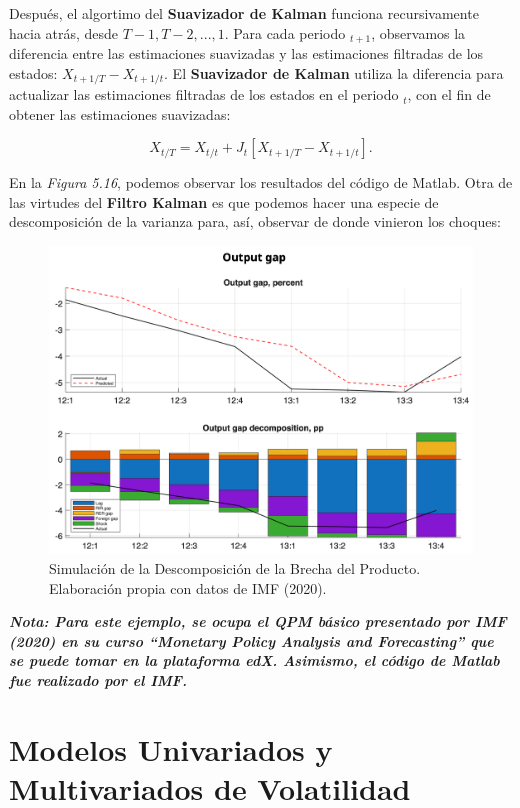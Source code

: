 \documentclass[
]{book}
\begin{document}
Después, el algortimo del \textbf{Suavizador de Kalman} funciona recursivamente hacia atrás, desde \(T-1, T-2,...,1\). Para cada periodo \(_{t+1}\), observamos la diferencia entre las estimaciones suavizadas y las estimaciones filtradas de los estados: \(X_{t+1/T}-X_{t+1/t}\). El \textbf{Suavizador de Kalman} utiliza la diferencia para actualizar las estimaciones filtradas de los estados en el periodo \(_t\), con el fin de obtener las estimaciones suavizadas:

\begin{equation}
X_{t/T} = X_{t/t} + J_t [X_{t+1/T} - X_{t+1/t}].
\label{eq:Sua}
\end{equation}

En la \emph{Figura 5.16}, podemos observar los resultados del código de Matlab. Otra de las virtudes del \textbf{Filtro Kalman} es que podemos hacer una especie de descomposición de la varianza para, así, observar de donde vinieron los choques:

\begin{figure}

{\centering \includegraphics[width=0.8\linewidth]{Plots/Filtration} 

}

\caption{Simulación de la Descomposición de la Brecha del Producto. Elaboración propia con datos de IMF (2020).}\label{fig:unnamed-chunk-24}
\end{figure}

\textbf{\emph{Nota: Para este ejemplo, se ocupa el QPM básico presentado por IMF (2020) en su curso ``Monetary Policy Analysis and Forecasting'' que se puede tomar en la plataforma edX. Asimismo, el código de Matlab fue realizado por el IMF.}}

\hypertarget{modelos-univariados-y-multivariados-de-volatilidad}{%
\chapter{Modelos Univariados y Multivariados de Volatilidad}\label{modelos-univariados-y-multivariados-de-volatilidad}}
\end{document}
